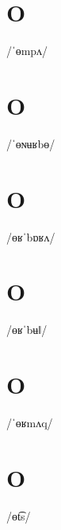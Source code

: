 \documentclass[10pt,a4paper,twoside]{book}
\begin{document}
\section*{O}

\begin{multicols}{3}
 {/ˈɵmpʌ/} {}
\end{multicols}

\section*{O}

\begin{multicols}{3}
 {/ˈɵɴʉʁbɵ/} {}
\end{multicols}

\section*{O}

\begin{multicols}{3}
 {/ɵʁˈbɒʁʌ/} {}
\end{multicols}

\section*{O}

\begin{multicols}{3}
 {/ɵʁˈbʉǁ/} {}
\end{multicols}

\section*{O}

\begin{multicols}{3}
 {/ˈɵʁmʌq/} {}
\end{multicols}

\section*{O}

\begin{multicols}{3}
 {/ɵt͡s/} {}
\end{multicols}
\end{document}
